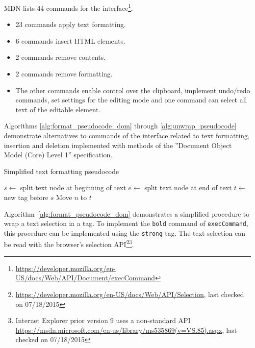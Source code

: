 MDN lists 44 commands for the  interface\footnote{\url{https://developer.mozilla.org/en-US/docs/Web/API/Document/execCommand}}. 

\begin{itemize}
\item 23 commands apply text formatting.
\item 6 commands insert HTML elements.
\item 2 commands remove contents.
\item 2 commands remove formatting.
\item The other commands enable control over the clipboard, implement undo/redo commands, set settings for the editing mode and one command can select all text of the editable element.
\end{itemize}

Algorithms \ref{alg:format_pseudocode_dom} through \ref{alg:unwrap_pseudocode} demonstrate alternatives to commands of the  interface related to text formatting, insertion and deletion implemented with methods of the ''Document Object Model (Core) Level 1'' specification.


\begin{algorithm}
\caption{Simplified text formatting pseudocode}
\label{alg:format_pseudocode_dom}
\begin{algorithmic}[1]
\State $s \gets$ split text node at beginning of text
\State $e \gets$ split text node at end of text
\State $t \gets$ new tag before $s$
  \State Move $n$ to $t$
\EndFor
\EndProcedure
\end{algorithmic}
\end{algorithm}



Algorithm~\ref{alg:format_pseudocode_dom} demonstrates a simplified procedure to wrap a text selection in a tag. To implement the \texttt{bold} command of \texttt{execCommand}, this procedure can be implemented using the \texttt{strong} tag. The text selection can be read with the browser's selection API\footnote{\url{https://developer.mozilla.org/en-US/docs/Web/API/Selection}, last checked on 07/18/2015}\footnote{Internet Explorer prior version 9 uses a non-standard API \url{https://msdn.microsoft.com/en-us/library/ms535869(v=VS.85).aspx}, last checked on 07/18/2015}.

